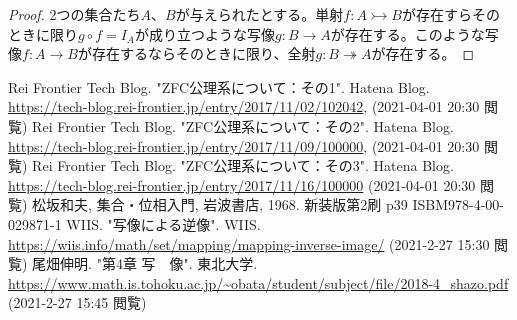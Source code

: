 \documentclass[dvipdfmx]{jsarticle}
\begin{document}
\begin{proof}
2つの集合たち$A$、$B$が与えられたとする。単射$f:A \rightarrowtail B$が存在すらそのときに限り$g \circ f = I_{A}$が成り立つような写像$g:B \rightarrow A$が存在する。このような写像$f:A \rightarrow B$が存在するならそのときに限り、全射$g:B \twoheadrightarrow A$が存在する。
\end{proof}
\begin{thebibliography}{50}
    Rei Frontier Tech Blog. "ZFC公理系について：その1". Hatena Blog. \url{https://tech-blog.rei-frontier.jp/entry/2017/11/02/102042}, (2021-04-01 20:30 閲覧)
    Rei Frontier Tech Blog. "ZFC公理系について：その2". Hatena Blog. \url{https://tech-blog.rei-frontier.jp/entry/2017/11/09/100000}, (2021-04-01 20:30 閲覧)
    Rei Frontier Tech Blog. "ZFC公理系について：その3". Hatena Blog. \url{https://tech-blog.rei-frontier.jp/entry/2017/11/16/100000} (2021-04-01 20:30 閲覧)
    松坂和夫, 集合・位相入門, 岩波書店, 1968. 新装版第2刷 p39 ISBM978-4-00-029871-1
    WIIS. "写像による逆像". WIIS. \url{https://wiis.info/math/set/mapping/mapping-inverse-image/} (2021-2-27 15:30 閲覧)
    尾畑伸明. "第4章 写　像". 東北大学. \url{https://www.math.is.tohoku.ac.jp/~obata/student/subject/file/2018-4_shazo.pdf} (2021-2-27 15:45 閲覧)
\end{thebibliography}
\end{document}
